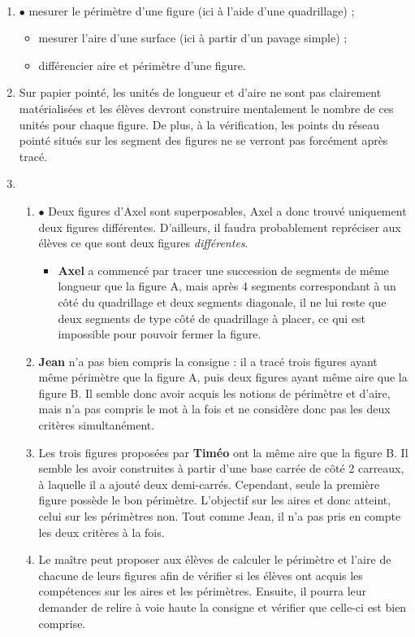 \ \\ [-5mm]
\begin{enumerate}
   \item \textcolor{A1}{$\bullet$} mesurer le périmètre d'une figure (ici à l'aide d'une quadrillage) ;
   \begin{itemize}
      \item mesurer l'aire d'une surface (ici à partir d'un pavage simple) ;
      \item différencier aire et périmètre d'une figure.
   \end{itemize}
\end{enumerate}
\Coupe
\begin{enumerate}
\setcounter{enumi}{1}
   \item Sur papier pointé, les unités de longueur et d'aire ne sont pas clairement matérialisées et les élèves devront construire mentalement le nombre de ces unités pour chaque figure. De plus, à la vérification, les \og points \fg{} du réseau pointé situés sur les segment des figures ne se verront pas forcément après tracé.
   \item
   \begin{enumerate}
      \item \textcolor{A1}{$\bullet$} Deux figures d'Axel sont superposables, Axel a donc trouvé uniquement deux figures différentes. D'ailleurs, il faudra probablement repréciser aux élèves ce que sont deux figures {\it différentes}.
      \begin{itemize}
         \item {\bf Axel} a commencé par tracer une succession de segments de même longueur que la figure A, mais après 4 segments correspondant à un côté du quadrillage et deux segments diagonale, il ne lui reste que deux segments de type côté de quadrillage à placer, ce qui est impossible pour pouvoir fermer la figure.
      \end{itemize}
      \item {\bf Jean} n'a pas bien compris la consigne : il a tracé trois figures ayant même périmètre que la figure A, puis deux figures ayant même aire que la figure B. Il semble donc avoir acquis les notions de périmètre et d'aire, mais n'a pas compris le mot \og à la fois \fg{} et ne considère donc pas les deux critères simultanément.
      \item Les trois figures proposées par {\bf Timéo} ont la même aire que la figure B. Il semble les avoir construites à partir d'une base carrée de côté 2 carreaux, à laquelle il a ajouté deux demi-carrés. Cependant, seule la première figure possède le bon périmètre. L'objectif sur les aires et donc atteint, celui sur les périmètres non. Tout comme Jean, il n'a pas pris en compte les deux critères à la fois.
      \item Le maître peut proposer aux élèves de calculer le périmètre et l'aire de chacune de leurs figures afin de vérifier si les élèves ont acquis les compétences sur les aires et les périmètres. Ensuite, il pourra leur demander de relire à voie haute la consigne et vérifier que celle-ci est bien comprise.
   \end{enumerate}
\end{enumerate}
